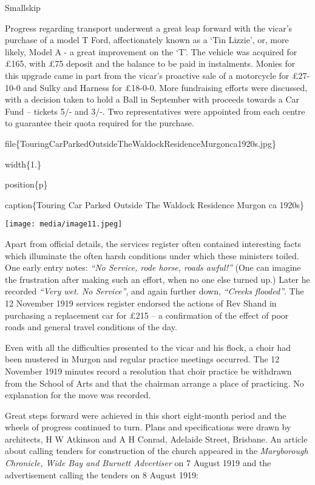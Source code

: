 Smallskip

Progress regarding transport underwent a great leap forward with the vicar's purchase of a model T Ford, affectionately known as a `Tin Lizzie', or, more likely, Model A - a great improvement on the `T'. The vehicle was acquired for £165, with £75 deposit and the balance to be paid in instalments. Monies for this upgrade came in part from the vicar's proactive sale of a motorcycle for £27-10-0 and Sulky and Harness for £18-0-0. More fundraising efforts were discussed, with a decision taken to hold a Ball in September with proceeds towards a Car Fund -- tickets 5/- and 3/-. Two representatives were appointed from each centre to guarantee their quota required for the purchase.

file\{TouringCarParkedOutsideTheWaldockResidenceMurgonca1920s.jpg\}

width\{1.\}

position\{p\}

caption\{Touring Car Parked Outside The Waldock Residence Murgon ca 1920s\}

\texttt{[image: media/image11.jpeg]}

Apart from official details, the services register often contained interesting facts which illuminate the often harsh conditions under which these ministers toiled. One early entry notes: \emph{``No Service, rode horse, roads awful!''} (One can imagine the frustration after making such an effort, when no one else turned up.) Later he recorded \emph{``Very wet. No Service''}, and again further down, \emph{``Creeks flooded''}. The 12 November 1919 services register endorsed the actions of Rev Shand in purchasing a replacement car for £215 -- a confirmation of the effect of poor roads and general travel conditions of the day.

Even with all the difficulties presented to the vicar and his flock, a choir had been mustered in Murgon and regular practice meetings occurred. The 12 November 1919 minutes record a resolution that choir practice be withdrawn from the School of Arts and that the chairman arrange a place of practicing. No explanation for the move was recorded.

Great steps forward were achieved in this short eight-month period and the wheels of progress continued to turn. Plans and specifications were drawn by architects, H W Atkinson and A H Conrad, Adelaide Street, Brisbane. An article about calling tenders for construction of the church appeared in the \emph{Maryborough Chronicle, Wide Bay and Burnett Advertiser} on 7 August 1919 and the advertisement calling the tenders on 8 August 1919:

